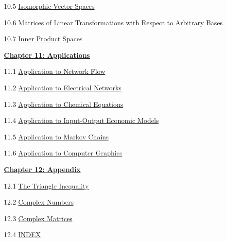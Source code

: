 \documentclass{ximera}
\begin{document}
10.5	\href{https://ximera.osu.edu/linearalgebradzv3/LinearAlgebraInteractiveIntro/LTR-0035/main}{Isomorphic Vector Spaces}
	
10.6	\href{https://ximera.osu.edu/linearalgebradzv3/LinearAlgebraInteractiveIntro/LTR-0060/main}{Matrices of Linear Transformations with Respect to Arbitrary Bases}
	
10.7	\href{https://ximera.osu.edu/linearalgebradzv3/LinearAlgebraInteractiveIntro/LTR-0080/main}{Inner Product Spaces}
		
\href{https://ximera.osu.edu/linearalgebradzv3/LinearAlgebraInteractiveIntro/XLAChapter_applications/main}{\textbf{Chapter 11: Applications}}
	
11.1	\href{https://ximera.osu.edu/linearalgebradzv3/LinearAlgebraInteractiveIntro/APP-0010/main}{Application to Network Flow}
	
11.2	\href{https://ximera.osu.edu/linearalgebradzv3/LinearAlgebraInteractiveIntro/APP-0020/main}{Application to Electrical Networks}
	
11.3	\href{https://ximera.osu.edu/linearalgebradzv3/LinearAlgebraInteractiveIntro/APP-0030/main}{Application to Chemical Equations}
	
11.4	\href{https://ximera.osu.edu/linearalgebradzv3/LinearAlgebraInteractiveIntro/APP-0050/main}{Application to Input-Output Economic Models}
	
11.5	\href{https://ximera.osu.edu/linearalgebradzv3/LinearAlgebraInteractiveIntro/APP-0060/main}{Application to Markov Chains}
	
11.6	\href{https://ximera.osu.edu/linearalgebradzv3/LinearAlgebraInteractiveIntro/APP-0040/main}{Application to Computer Graphics}
	
\href{https://ximera.osu.edu/linearalgebradzv3/LinearAlgebraInteractiveIntro/XLAChapter_appendix/main}{\textbf{Chapter 12: Appendix}}
	
12.1	\href{https://ximera.osu.edu/linearalgebradzv3/LinearAlgebraInteractiveIntro/APX-0010/main}{The Triangle Inequality}
	
12.2	\href{https://ximera.osu.edu/linearalgebradzv3/LinearAlgebraInteractiveIntro/APX-0020/main}{Complex Numbers}
	
12.3
\href{https://ximera.osu.edu/linearalgebradzv3/LinearAlgebraInteractiveIntro/RTH-0050/main}{Complex Matrices}
	
12.4	\href{https://ximera.osu.edu/linearalgebradzv3/LinearAlgebraInteractiveIntro/INDEX/main}{INDEX}
\end{document}
